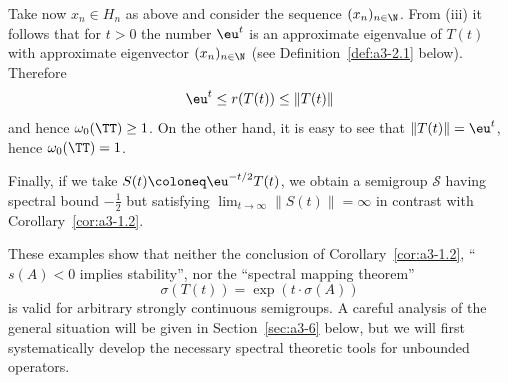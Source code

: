 Take now $x_{n} \in H_{n}$ as above and consider the sequence $(x_{n})_{n \in \N}$.
From (iii) it follows that for $t > 0$ the number $\eu^{t}$ is an approximate eigenvalue of\/ $T(t)$ with approximate eigenvector $(x_{n})_{n \in \N}$ (see Definition~\ref{def:a3-2.1} below).
Therefore 
%
\[
	 \eu^{t} \leq r(T(t)) \leq \|T(t)\|
\]
%
and hence $\omega_{0}(\TT) \geq 1$.
On the other hand, it is easy to see that $\|T(t)\| = \eu^{t}$, hence $\omega_{0}(\TT) = 1$.


Finally, if we take $S(t) \coloneq \eu^{-t/2}T(t)$, we obtain a semigroup $\mathcal{S}$ 
having spectral bound $-\frac{1}{2}$ but satisfying $\lim_{t \to \infty} \|S(t)\| = \infty$ in contrast with Corollary~\ref{cor:a3-1.2}.

These examples show that neither the conclusion of Corollary~\ref{cor:a3-1.2}, \ie \enquote{$s(A) < 0$ implies stability}, nor the \enquote{spectral mapping theorem}
\[
    \sigma(T(t)) = \exp(t\cdot\sigma(A))
\]
is valid for arbitrary strongly continuous semigroups.
A careful analysis of the general situation will be given in Section~\ref{sec:a3-6} below, but we will first systematically develop the necessary spectral theoretic tools for unbounded operators.
